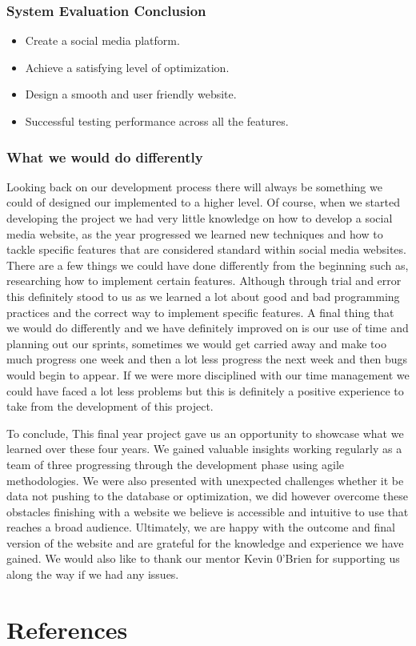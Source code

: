 \subsection{System Evaluation Conclusion}
\begin{itemize}
    \item Create a social media platform.
    \item Achieve a satisfying level of optimization.
    \item Design a smooth and user friendly website.
    \item Successful testing performance across all the features.
\end{itemize}

\subsection{What we would do differently}
\newline
Looking back on our development process there will always be something we could of designed our implemented to a higher level. Of course, when we started developing the project we had very little knowledge on how to develop a social media website, as the year progressed we learned new techniques and how to tackle specific features that are considered standard within social media websites. There are a few things we could have done differently from the beginning such as, researching how to implement certain features. Although through trial and error this definitely stood to us as we learned a lot about good and bad programming practices and the correct way to implement specific features. A final thing that we would do differently and we have definitely improved on is our use of time and planning out our sprints, sometimes we would get carried away and make too much progress one week and then a lot less progress the next week and then bugs would begin to appear. If we were more disciplined with our time management we could have faced a lot less problems but this is definitely a positive experience to take from the development of this project.
\newline

To conclude, This final year project gave us an opportunity to showcase what we learned over these four years. We gained valuable insights working regularly as a team of three progressing through the development phase using agile methodologies.
We were also presented with unexpected challenges whether it be data not pushing to the database or optimization, we did however overcome these obstacles finishing with a website we believe is accessible and intuitive to use that reaches a broad audience.
\newline
Ultimately, we are happy with the outcome and final version of the website and are grateful for the knowledge and experience we have gained. We would also like to thank our mentor Kevin 0'Brien for supporting us along the way if we had any issues.

\chapter{References}
\cite{githublink}